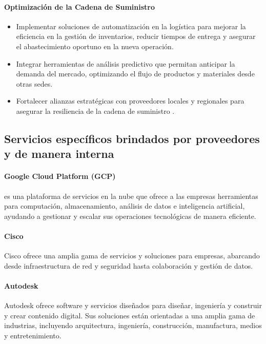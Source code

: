     \paragraph*{Optimización de la Cadena de Suministro}
        \begin{itemize}
            \item Implementar soluciones de automatización en la logística para mejorar la eficiencia en la gestión de inventarios, reducir tiempos de entrega y asegurar el abastecimiento oportuno en la nueva operación.
            \item Integrar herramientas de análisis predictivo que permitan anticipar la demanda del mercado, optimizando el flujo de productos y materiales desde otras sedes.
            \item Fortalecer alianzas estratégicas con proveedores locales y regionales para asegurar la resiliencia de la cadena de suministro .
        \end{itemize}

\subsection{Servicios específicos brindados por proveedores y de manera interna}

\paragraph*{Google Cloud Platform (GCP)}es una plataforma de servicios en la nube que ofrece a las empresas herramientas para computación, almacenamiento, análisis de datos e inteligencia artificial, ayudando a gestionar y escalar sus operaciones tecnológicas de manera eficiente.

\paragraph*{Cisco} Cisco ofrece una amplia gama de servicios y soluciones para empresas, abarcando desde infraestructura de red y seguridad hasta colaboración y gestión de datos. 

\paragraph*{Autodesk} Autodesk ofrece software y servicios diseñados para diseñar, ingeniería y construir y crear contenido digital. Sus soluciones están orientadas a una amplia gama de industrias, incluyendo arquitectura, ingeniería, construcción, manufactura, medios y entretenimiento. 



